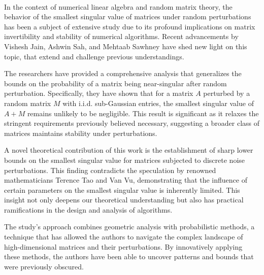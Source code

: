 
~\cite{jain2020smoothed}

In the context of numerical linear algebra and random matrix theory,
the behavior of the smallest singular value of matrices under random
perturbations has been a subject of extensive study due to its profound
implications on matrix invertibility and stability of numerical algorithms.
Recent advancements by Vishesh Jain, Ashwin Sah, and Mehtaab Sawhney have 
shed new light on this topic, that extend and challenge previous
understandings.

The researchers have provided a comprehensive analysis that generalizes
the bounds on the probability of a matrix being near-singular after
random perturbation. Specifically, they have shown that for a matrix
${A}$ perturbed by a random matrix 
${M}$ with i.i.d. sub-Gaussian entries, the smallest singular value
of ${A+M}$ remains unlikely to be negligible. This result is significant
as it relaxes the stringent requirements previously believed necessary,
suggesting a broader class of matrices maintains stability under
perturbations.

A novel theoretical contribution of this work is the establishment 
of sharp lower bounds on the smallest singular value for matrices
subjected to discrete noise perturbations. This finding contradicts
the speculation by renowned mathematicians Terence Tao and Van Vu,
demonstrating that the influence of certain parameters on the smallest
singular value is inherently limited. This insight not only deepens our
theoretical understanding but also has practical ramifications in 
the design and analysis of algorithms.

The study's approach combines geometric
analysis with probabilistic methods, a technique
that has allowed the authors to navigate the complex landscape
of high-dimensional matrices and their perturbations.
By innovatively applying these methods, 
the authors have been able to uncover patterns and bounds
that were previously obscured.

